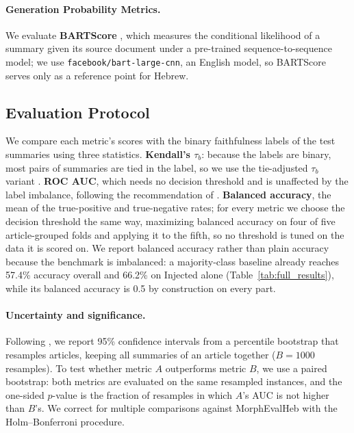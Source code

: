 \documentclass[11pt]{article}
\begin{document}
\paragraph{Generation Probability Metrics.}
We evaluate \textbf{BARTScore} \cite{yuan2021bartscore}, which measures the conditional likelihood of a summary given its source document under a pre-trained sequence-to-sequence model; we use \texttt{facebook/bart-large-cnn}, an English model, so BARTScore serves only as a reference point for Hebrew.




\subsection{Evaluation Protocol}
\label{sec:protocol}
We compare each metric's scores with the binary faithfulness labels of the test summaries using three statistics. \textbf{Kendall's $\tau_b$}: because the labels are binary, most pairs of summaries are tied in the label, so we use the tie-adjusted $\tau_b$ variant \citep{deutsch-etal-2023-ties}. \textbf{ROC AUC}, which needs no decision threshold and is unaffected by the label imbalance, following the recommendation of \citet{honovich2022true}. \textbf{Balanced accuracy}, the mean of the true-positive and true-negative rates; for every metric we choose the decision threshold the same way, maximizing balanced accuracy on four of five article-grouped folds and applying it to the fifth, so no threshold is tuned on the data it is scored on. We report balanced accuracy rather than plain accuracy because the benchmark is imbalanced: a majority-class baseline already reaches 57.4\% accuracy overall and 66.2\% on Injected alone (Table~\ref{tab:full_results}), while its balanced accuracy is 0.5 by construction on every part.

\paragraph{Uncertainty and significance.}
Following \citet{deutsch-etal-2021-statistical}, we report 95\% confidence intervals from a percentile bootstrap that resamples articles, keeping all summaries of an article together ($B=1000$ resamples). To test whether metric $A$ outperforms metric $B$, we use a paired bootstrap: both metrics are evaluated on the same resampled instances, and the one-sided $p$-value is the fraction of resamples in which $A$'s AUC is not higher than $B$'s. We correct for multiple comparisons against MorphEvalHeb with the Holm--Bonferroni procedure.
\end{document}
